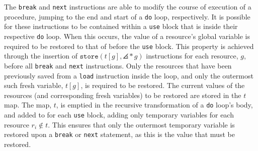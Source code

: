 The \texttt{break} and \texttt{next} instructions are able to modify the course of execution of a procedure, jumping to the end and start of a \texttt{do} loop, respectively. It is possible for these instructions to be contained within a \texttt{use} block that is inside their respective \texttt{do} loop. When this occurs, the value of a resource's global variable is required to be restored to that of before the \texttt{use} block. This property is achieved through the insertion of $\mathtt{store}(t[g], \angles*{g})$ instructions for each resource, $g$, before all \texttt{break} and \texttt{next} instructions. Only the resources that have been previously saved from a \texttt{load} instruction inside the loop, and only the outermost such fresh variable, $t[g]$, is required to be restored. The current values of the resources (and corresponding fresh variables) to be restored are stored in the $t$ map. The map, $t$, is emptied in the recursive transformation of a \texttt{do} loop's body, and added to for each \texttt{use} block, adding only temporary variables for each resource $r_i \notin t$. This ensures that only the outermost temporary variable is restored upon a \texttt{break} or \texttt{next} statement, as this is the value that must be restored.


